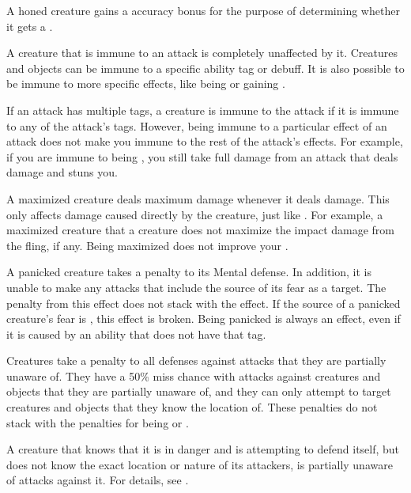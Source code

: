    A honed creature gains a  accuracy bonus for the purpose of determining whether it gets a .

   A creature that is immune to an attack is completely unaffected by it.
  Creatures and objects can be immune to a specific ability tag or debuff.
  It is also possible to be immune to more specific effects, like being \grappled or gaining .

  If an attack has multiple tags, a creature is immune to the attack if it is immune to any of the attack's tags.
  However, being immune to a particular effect of an attack does not make you immune to the rest of the attack's effects.
  For example, if you are immune to being \dazed, you still take full damage from an attack that deals damage and stuns you.

   A maximized creature deals maximum damage whenever it deals damage.
  This only affects damage caused directly by the creature, just like .
  For example, a maximized creature that  a creature does not maximize the impact damage from the fling, if any.
  Being maximized does not improve your .

   A panicked creature takes a  penalty to its Mental defense.
  In addition, it is unable to make any attacks that include the source of its fear as a target.
  The penalty from this effect does not stack with the \frightened effect.
  If the source of a panicked creature's fear is , this effect is broken.
  Being panicked is always an  effect, even if it is caused by an ability that does not have that tag.

   Creatures take a  penalty to all defenses against attacks that they are partially unaware of.
  They have a 50\% miss chance with  attacks against creatures and objects that they are partially unaware of, and they can only attempt to target creatures and objects that they know the location of.
  These penalties do not stack with the penalties for being \unaware or \unsteady.

  A creature that knows that it is in danger and is attempting to defend itself, but does not know the exact location or nature of its attackers, is partially unaware of attacks against it.
  For details, see .

